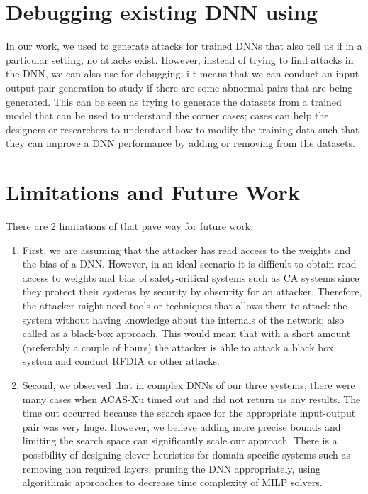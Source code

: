 \section{Debugging existing DNN using \tool}
In our work, we used \tool to generate attacks for trained \ac{DNN}s that also tell us if in a particular setting, no attacks exist. 
However, instead of trying to find attacks in the \ac{DNN}, we can also use \tool for debugging; i
t means that we can conduct an input-output pair generation to study if there are some abnormal pairs that are being generated. 
This can be seen as trying to generate the datasets from a trained model that can be used to understand the corner cases; cases can help the designers or researchers to understand how to modify the training data such that they can improve a \ac{DNN} performance by adding or removing from the datasets. 



\section{ Limitations  and Future Work}

There are 2 limitations of \tool that pave way for future work. 
\begin{enumerate}
	\item First, we are assuming that the attacker has read access to the weights and the bias of a \ac{DNN}.
	However, in an ideal scenario it is difficult to obtain read access to weights and bias of safety-critical systems such as \ac{CA} systems since they protect their systems by security by obscurity for an attacker. 
	Therefore, the attacker might need tools or techniques that allows them to attack the system without having knowledge about the internals of the network; also called as a black-box approach. 
	This would mean that with a short amount (preferably a couple of hours) the attacker is able to attack a black box system and conduct \ac{RFDIA} or other attacks. 
	\item Second, we observed that in complex \ac{DNN}s of our three systems, there were many cases when  \ac{ACAS-Xu} timed out and did not return us any results. 
	The time out occurred because the search space for the appropriate input-output pair was very huge. 
	However, we believe adding more precise bounds and limiting the search space can significantly scale our approach. 
	There is a possibility of designing clever heuristics for domain specific systems such as removing non required layers, pruning the \ac{DNN} appropriately, using algorithmic approaches to decrease time complexity of \ac{MILP} solvers. 
	
	\label{section:limitations}
	
\end{enumerate}

